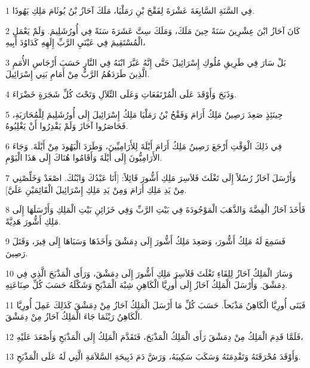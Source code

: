 \par 1 فِي السَّنَةِ السَّابِعَةَ عَشْرَةَ لِفَقْحَ بْنِ رَمَلْيَا، مَلَكَ آحَازُ بْنُ يُوثَامَ مَلِكِ يَهُوذَا.
\par 2 كَانَ آحَازُ ابْنَ عِشْرِينَ سَنَةً حِينَ مَلَكَ، وَمَلَكَ سِتَّ عَشَرَةَ سَنَةً فِي أُورُشَلِيمَ. وَلَمْ يَعْمَلِ الْمُسْتَقِيمَ فِي عَيْنَيِ الرَّبِّ إِلَهِهِ كَدَاوُدَ أَبِيهِ،
\par 3 بَلْ سَارَ فِي طَرِيقِ مُلُوكِ إِسْرَائِيلَ حَتَّى إِنَّهُ عَبَّرَ ابْنَهُ فِي النَّارِ حَسَبَ أَرْجَاسِ الأُمَمِ الَّذِينَ طَرَدَهُمُ الرَّبُّ مِنْ أَمَامِ بَنِي إِسْرَائِيلَ.
\par 4 وَذَبَحَ وَأَوْقَدَ عَلَى الْمُرْتَفَعَاتِ وَعَلَى التِّلاَلِ وَتَحْتَ كُلِّ شَجَرَةٍ خَضْرَاءَ.
\par 5 حِينَئِذٍ صَعِدَ رَصِينُ مَلِكُ أَرَامَ وَفَقْحُ بْنُ رَمَلْيَا مَلِكُ إِسْرَائِيلَ إِلَى أُورُشَلِيمَ لِلْمُحَارَبَةِ، فَحَاصَرُوا آحَازَ وَلَمْ يَقْدِرُوا أَنْ يَغْلِبُوهُ.
\par 6 فِي ذَلِكَ الْوَقْتِ أَرْجَعَ رَصِينُ مَلِكُ أَرَامَ أَيْلَةَ لِلأَرَامِيِّينَ، وَطَرَدَ الْيَهُودَ مِنْ أَيْلَةَ. وَجَاءَ الأَرَامِيُّونَ إِلَى أَيْلَةَ وَأَقَامُوا هُنَاكَ إِلَى هَذَا الْيَوْمِ.
\par 7 وَأَرْسَلَ آحَازُ رُسُلاً إِلَى تَغْلَثَ فَلاَسِرَ مَلِكِ أَشُّورَ قَائِلاً: [أَنَا عَبْدُكَ وَابْنُكَ. اصْعَدْ وَخَلِّصْنِي مِنْ يَدِ مَلِكِ أَرَامَ وَمِنْ يَدِ مَلِكِ إِسْرَائِيلَ الْقَائِمَيْنِ عَلَيَّ].
\par 8 فَأَخَذَ آحَازُ الْفِضَّةَ وَالذَّهَبَ الْمَوْجُودَةَ فِي بَيْتِ الرَّبِّ وَفِي خَزَائِنِ بَيْتِ الْمَلِكِ وَأَرْسَلَهَا إِلَى مَلِكِ أَشُّورَ هَدِيَّةً.
\par 9 فَسَمِعَ لَهُ مَلِكُ أَشُّورَ، وَصَعِدَ مَلِكُ أَشُّورَ إِلَى دِمَشْقَ وَأَخَذَهَا وَسَبَاهَا إِلَى قِيرَ، وَقَتَلَ رَصِينَ.
\par 10 وَسَارَ الْمَلِكُ آحَازُ لِلِقَاءِ تَغْلَثَ فَلاَسِرَ مَلِكِ أَشُّورَ إِلَى دِمَشْقَ، وَرَأَى الْمَذْبَحَ الَّذِي فِي دِمَشْقَ. وَأَرْسَلَ الْمَلِكُ آحَازُ إِلَى أُورِيَّا الْكَاهِنِ شِبْهَ الْمَذْبَحِ وَشَكْلَهُ حَسَبَ كُلِّ صِنَاعَتِهِ.
\par 11 فَبَنَى أُورِيَّا الْكَاهِنُ مَذْبَحاً. حَسَبَ كُلِّ مَا أَرْسَلَ الْمَلِكُ آحَازُ مِنْ دِمَشْقَ كَذَلِكَ عَمِلَ أُورِيَّا الْكَاهِنُ رَيْثَمَا جَاءَ الْمَلِكُ آحَازُ مِنْ دِمَشْقَ.
\par 12 فَلَمَّا قَدِمَ الْمَلِكُ مِنْ دِمَشْقَ رَأَى الْمَلِكُ الْمَذْبَحَ، فَتَقَدَّمَ الْمَلِكُ إِلَى الْمَذْبَحِ وَأَصْعَدَ عَلَيْهِ،
\par 13 وَأَوْقَدَ مُحْرَقَتَهُ وَتَقْدِمَتَهُ وَسَكَبَ سَكِيبَهُ، وَرَشَّ دَمَ ذَبِيحَةِ السَّلاَمَةِ الَّتِي لَهُ عَلَى الْمَذْبَحِ.
